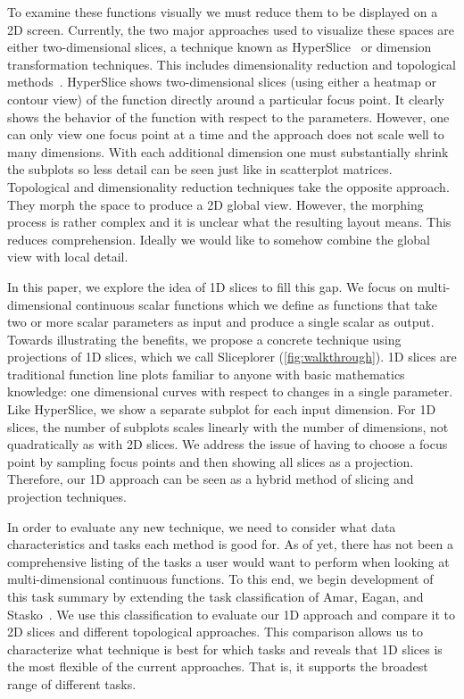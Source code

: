 To examine these functions visually we must reduce them to be
displayed on a 2D screen. 
Currently, the two major approaches used to visualize these spaces are either
two-dimensional slices, a technique known as HyperSlice~\cite{Wijk:1993} or dimension transformation techniques. This includes dimensionality
reduction and topological methods~\cite{Correa:2011,Carr:2003a}.  HyperSlice
shows two-dimensional slices (using either a heatmap or contour view)
of the function directly around a particular focus point. It clearly shows the
behavior of the function with respect to the parameters. However, one can only
view one focus point at a time and 
the approach does not scale well to many dimensions.
With each additional dimension one must substantially 
shrink the subplots so less detail can be seen just like in scatterplot matrices. Topological and dimensionality
reduction techniques take the opposite approach. They morph the space to
produce a 2D global view. However, the morphing process is rather
complex and it is unclear what the resulting layout means. This reduces
comprehension. Ideally we would like to somehow combine the global view with
local detail.

In this paper, we explore the idea of 1D slices to fill this gap. We focus on 
multi-dimensional continuous scalar functions which we define as functions that take two or more
scalar parameters as input and produce a single scalar as output.
Towards illustrating the benefits, we propose a concrete technique using projections of 1D slices, which we call Sliceplorer (\autoref{fig:walkthrough}). 
1D slices are traditional function line plots familiar to anyone with
basic mathematics knowledge: one dimensional curves with respect to
changes in a single parameter. 
Like HyperSlice, we show a separate subplot
for each input dimension. For 1D slices, the number of
subplots scales linearly with the number of dimensions, not quadratically as with 2D slices. We address the issue of having to choose a focus
point by sampling focus points and then showing all slices as a
projection. Therefore, our 1D approach can be seen as a hybrid method of slicing
and projection techniques. 

In order to evaluate any new technique, we need to
consider what data characteristics and tasks each method is good for. As of yet, there has not been a comprehensive
listing of the tasks a user would want to perform when looking at
multi-dimensional continuous functions. To this
end, we begin development of this task summary by extending the task classification of Amar, Eagan, and Stasko~\cite{Amar:2005}. We use this classification to evaluate our 1D approach and compare it to 2D slices and different topological approaches. This comparison allows us to characterize what technique is best for which tasks and reveals that 1D slices is the most flexible of the current approaches. That is, it supports the broadest range of different tasks.

